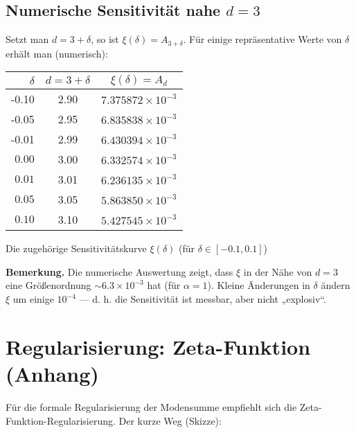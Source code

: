\documentclass[12pt,a4paper]{article}
\begin{document}
	\subsection{Numerische Sensitivität nahe \(d=3\)}
	Setzt man \(d=3+\delta\), so ist \(\xi(\delta)=A_{3+\delta}\). Für einige repräsentative Werte von \(\delta\) erhält man (numerisch):
	\begin{center}
		\begin{tabular}{r c c}
			\toprule
			\(\delta\) & \(d=3+\delta\) & \(\xi(\delta)=A_d\) \\
			\midrule
			-0.10 & 2.90 & \(7.375872\times10^{-3}\) \\
			-0.05 & 2.95 & \(6.835838\times10^{-3}\) \\
			-0.01 & 2.99 & \(6.430394\times10^{-3}\) \\
			\(0.00\) & 3.00 & \(6.332574\times10^{-3}\) \\
			\(0.01\) & 3.01 & \(6.236135\times10^{-3}\) \\
			\(0.05\) & 3.05 & \(5.863850\times10^{-3}\) \\
			\(0.10\) & 3.10 & \(5.427545\times10^{-3}\) \\
			\bottomrule
		\end{tabular}
	\end{center}
	
	Die zugehörige Sensitivitätskurve \(\xi(\delta)\) (für \(\delta\in[-0.1,0.1]\)) 
	
	
	\noindent\textbf{Bemerkung.} Die numerische Auswertung zeigt, dass \(\xi\) in der Nähe von \(d=3\) eine Größenordnung \(\sim 6.3\times10^{-3}\) hat (für \(\alpha=1\)). Kleine Änderungen in \(\delta\) ändern \(\xi\) um einige \(10^{-4}\) — d. h. die Sensitivität ist messbar, aber nicht „explosiv“.
	
	\section{Regularisierung: Zeta-Funktion (Anhang)}
	\label{app:zeta}
	
	Für die formale Regularisierung der Modensumme empfiehlt sich die Zeta-Funktion-Regularisierung. Der kurze Weg (Skizze):
	
\end{document}
